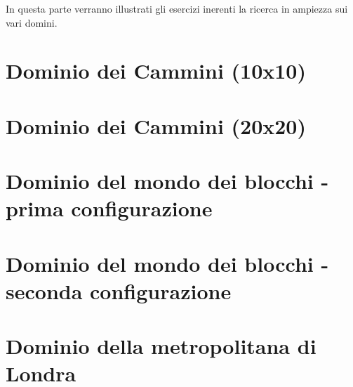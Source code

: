 In questa parte verranno illustrati gli esercizi inerenti la ricerca in ampiezza sui vari domini.

\section{Dominio dei Cammini (10x10)}

\section{Dominio dei Cammini (20x20)}

\section{Dominio del mondo dei blocchi - prima configurazione}

\section{Dominio del mondo dei blocchi - seconda configurazione}

\section{Dominio della metropolitana di Londra}
